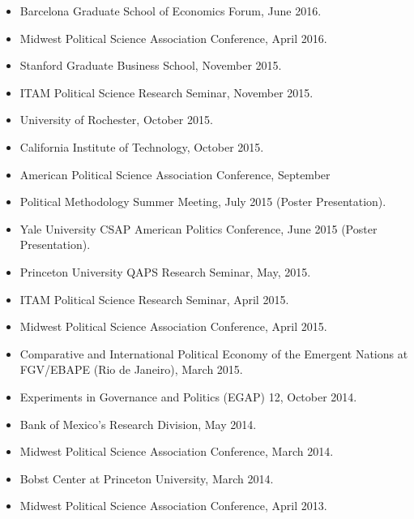 \documentclass[margin, 10pt]{res} %
\begin{document}
\begin{resume}
\begin{itemize}
     September 2016.
\item[-] Barcelona Graduate School of Economics Forum, June 2016.
\item[-] Midwest Political Science Association Conference, April 2016.
 \item[-] Stanford Graduate Business School, November 2015.
\item[-] ITAM Political Science Research Seminar, November 2015.
\item[-] University of Rochester, October 2015.
\item[-] California Institute of Technology, October 2015.
\item[-] American Political Science Association Conference, September
\item[-] Political Methodology Summer Meeting, July 2015 (Poster Presentation).
\item[-] Yale University CSAP American Politics Conference, June 2015
  (Poster Presentation).
\item[-] Princeton University QAPS Research Seminar, May, 2015.
\item[-] ITAM Political Science Research Seminar, April 2015.
\item[-] Midwest Political Science Association Conference, April 2015.
\item[-] Comparative and International Political Economy of the
  Emergent Nations at FGV/EBAPE (Rio de Janeiro), March 2015.
\item[-] Experiments in Governance and Politics (EGAP) 12, October 2014.
\item[-] Bank of Mexico's Research Division, May 2014.
\item[-] Midwest Political Science Association Conference, March 2014.
\item[-] Bobst Center at Princeton University, March 2014.
\item[-] Midwest Political Science Association Conference, April 2013.
\end{itemize}



\end{resume}
\end{document}
